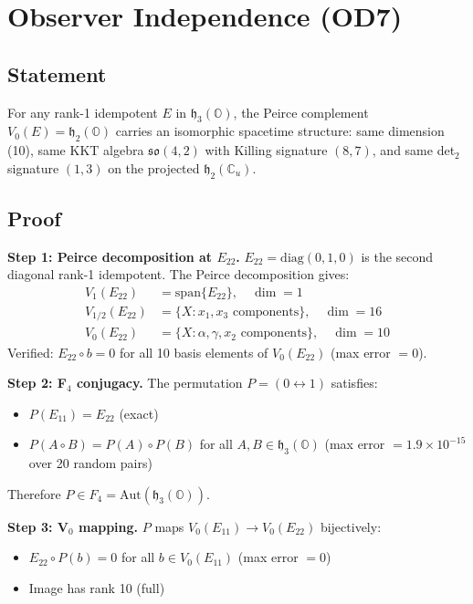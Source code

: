 
\section{Observer Independence (OD7)}

\subsection{Statement}

For any rank-1 idempotent $E$ in $\mathfrak{h}_3(\mathbb{O})$, the Peirce
complement $V_0(E) = \mathfrak{h}_2(\mathbb{O})$ carries an isomorphic
spacetime structure: same dimension (10), same KKT algebra
$\mathfrak{so}(4,2)$ with Killing signature $(8,7)$, and same det$_2$
signature $(1,3)$ on the projected $\mathfrak{h}_2(\mathbb{C}_u)$.

\subsection{Proof}

\textbf{Step 1: Peirce decomposition at $E_{22}$.}
$E_{22} = \mathrm{diag}(0,1,0)$ is the second diagonal rank-1 idempotent.
The Peirce decomposition gives:
\begin{align}
  V_1(E_{22}) &= \mathrm{span}\{E_{22}\}, \quad \dim = 1 \\
  V_{1/2}(E_{22}) &= \{X : x_1, x_3 \text{ components}\}, \quad \dim = 16 \\
  V_0(E_{22}) &= \{X : \alpha, \gamma, x_2 \text{ components}\}, \quad \dim = 10
\end{align}
Verified: $E_{22} \circ b = 0$ for all 10 basis elements of $V_0(E_{22})$
(max error $= 0$).

\textbf{Step 2: F$_4$ conjugacy.}
The permutation $P = (0 \leftrightarrow 1)$ satisfies:
\begin{itemize}
  \item $P(E_{11}) = E_{22}$ (exact)
  \item $P(A \circ B) = P(A) \circ P(B)$ for all $A, B \in \mathfrak{h}_3(\mathbb{O})$
    (max error $= 1.9 \times 10^{-15}$ over 20 random pairs)
\end{itemize}
Therefore $P \in F_4 = \mathrm{Aut}(\mathfrak{h}_3(\mathbb{O}))$.

\textbf{Step 3: V$_0$ mapping.}
$P$ maps $V_0(E_{11}) \to V_0(E_{22})$ bijectively:
\begin{itemize}
  \item $E_{22} \circ P(b) = 0$ for all $b \in V_0(E_{11})$ (max error $= 0$)
  \item Image has rank 10 (full)
\end{itemize}

